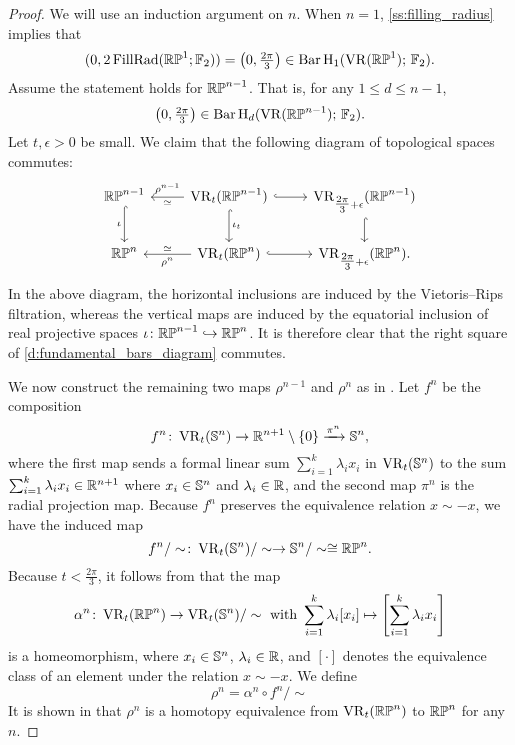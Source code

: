\begin{proof}
	We will use an induction argument on $n$.
	When $n = 1$, \cref{ss:filling_radius} implies that
	\[
	(0, 2\operatorname{FillRad}(\mathbb{RP}^1;{\mathbb{F}_2})) = \left(0, \tfrac{2\pi}{3}\right) \in \operatorname{Bar} \operatorname{H}_{1}(\operatorname{VR}(\mathbb{RP}^1);\,{\mathbb{F}_2}).
	\]
	Assume the statement holds for $\mathbb{RP}^{n-1}$.
	That is, for any $1 \leq d \leq n-1$,
	\[
	\left(0, \tfrac{2\pi}{3}\right) \in \operatorname{Bar} \operatorname{H}_{d}(\operatorname{VR}(\mathbb{RP}^{n-1});\,{\mathbb{F}_2}).
	\]
	Let $t, \epsilon > 0$ be small.
	We claim that the following diagram of topological spaces commutes:
	\begin{equation}\label{d:fundamental_bars_diagram}
		\begin{tikzcd}
			\rp^{n-1}
			\ar[d, hook,"{\iota}" left]
			&
			\VR_t(\rp^{n-1})
			\ar[d, hook,"\iota_t"]
			\ar[l, "\rho^{n-1}" above, "\simeq" below]
			\ar[r, hook]
			&
			\VR_{\tfrac{2\pi}{3}+\epsilon}(\rp^{n-1})
			\ar[d, hook]
			\\
			\rp^{n}
			&
			\VR_t(\rp^{n})
			\ar[l, "\rho^n" below, "\simeq" above]
			\ar[r, hook]
			&
			\VR_{\tfrac{2\pi}{3}+\epsilon}(\rp^{n}).
		\end{tikzcd}
	\end{equation}
	In the above diagram, the horizontal inclusions are induced by the Vietoris--Rips filtration, whereas the vertical maps are induced by the equatorial inclusion of real projective spaces $\iota \colon \mathbb{RP}^{n-1} \hookrightarrow \mathbb{RP}^{n}$.
	It is therefore clear that the right square of \eqref{d:fundamental_bars_diagram} commutes.
	
	We now construct the remaining two maps $\rho^{n-1}$ and $\rho^{n}$ as in \cite[]{adams2022metric}.
	Let $f^n$ be the composition
	\[
	f^n \colon \operatorname{VR}_t(\mathbb{S}^n) \to \mathbb{R}^{n+1} \setminus \{0\} \xrightarrow{\pi^n} \mathbb{S}^{n},
	\]
	where the first map sends a formal linear sum $\sum_{i=1}^k \lambda_i x_i$ in $\operatorname{VR}_t(\mathbb{S}^n)$ to the sum $\sum_{i=1}^k \lambda_i x_i \in \mathbb{R}^{n+1}$ where $x_i \in \mathbb{S}^{n}$ and $\lambda_i \in \mathbb{R}$, and the second map $\pi^n$ is the radial projection map.
	Because $f^n$ preserves the equivalence relation $x \sim -x$, we have the induced map %
	\[
	f^n/\sim \colon \operatorname{VR}_t(\mathbb{S}^{n})/\sim\to \mathbb{S}^{n}/\sim\cong \mathbb{RP}^n.
	\]
	Because $t < \tfrac{2\pi}{3}$, it follows from \cite[Lemma 4.4]{adams2022metric} that the map
	\[
	\alpha^n \colon \operatorname{VR}_t(\mathbb{RP}^n) \to \operatorname{VR}_t(\mathbb{S}^n)/\sim \text{ with }
	\sum_{i=1}^k \lambda_i [x_i] \mapsto \left[\sum_{i=1}^k \lambda_i x_i\right]
	\]
	is a homeomorphism, where $x_i \in \mathbb{S}^{n}$, $\lambda_i \in \mathbb{R}$, and $[\cdot]$ denotes the equivalence class of an element under the relation $x \sim -x$. 
	We define
	\[\rho^n = \alpha^n \circ f^n/\sim \]
	It is shown in \cite[Theorem 4.5]{adams2022metric} that $\rho^n$ is a homotopy equivalence from $\operatorname{VR}_t(\mathbb{RP}^n)$ to $\mathbb{RP}^n$ for any $n$.
	

\end{proof}

